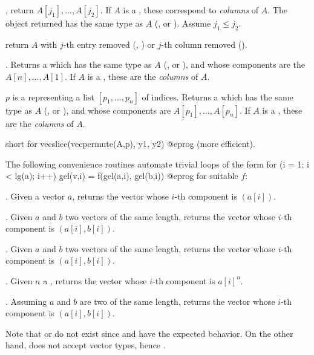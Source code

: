 , return $A[j_1], \dots,
A[j_2]$. If $A$ is a , these correspond to \emph{columns} of $A$.
The object returned has the same type as $A$ (,  or
). Assume $j_1 \leq j_2$.

 return $A$ with $j$-th entry removed
(, ) or $j$-th column removed ().

. Returns a  which has the same
type as $A$ (,  or ), and whose components
are the $A[n],\dots,A[1]$. If $A$ is a , these are the
\emph{columns} of $A$.

 $p$ is a  representing
a list $[p_1,\dots,p_n]$ of indices. Returns a  which has the same
type as $A$ (,  or ), and whose components
are $A[p_1],\dots,A[p_n]$. If $A$ is a , these are the
\emph{columns} of $A$.

 short for
\bprog
  vecslice(vecpermute(A,p), y1, y2)
@eprog\noindent
(more efficient).


The following convenience routines automate trivial loops of the form
\bprog
  for (i = 1; i < lg(a); i++) gel(v,i) = f(gel(a,i), gel(b,i))
@eprog\noindent
for suitable $f$:

. Given a vector $a$,
returns the vector whose $i$-th component is $(a[i])$.

. Given $a$ and $b$ two vectors of the same
length, returns the vector whose $i$-th component is $(a[i], b[i])$.

. Given $a$ and $b$ two vectors of the same
length, returns the vector whose $i$-th component is $(a[i], b[i])$.

. Given $n$ a , returns
the vector whose $i$-th component is $a[i]^n$.

. Assuming $a$ and $b$ are two 
of the same length, returns the vector whose $i$-th component
is $(a[i], b[i])$.

Note that  or  do not exist since 
and  have the expected behavior. On the other hand,
 does not accept vector types, hence .

